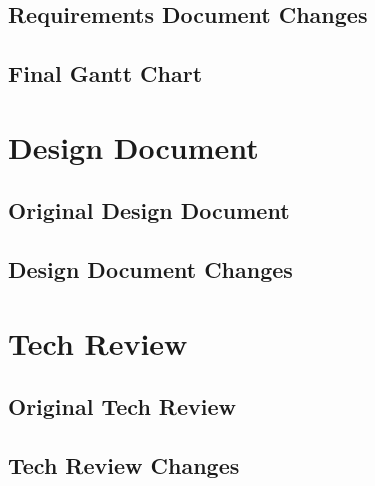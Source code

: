 \documentclass[10pt,journal,compsoc,onecolumn, draftclsnofoot]{IEEEtran}
\begin{document}
\subsection{Requirements Document Changes}

\subsection{Final Gantt Chart}
\begin{gantt}{8}{7}
	\begin{ganttitle}
	\end{ganttitle}
\end{gantt}

\section{Design Document}
\subsection{Original Design Document}


\subsection{Design Document Changes}

\section{Tech Review}
\subsection{Original Tech Review}


\subsection{Tech Review Changes}
\end{document}

